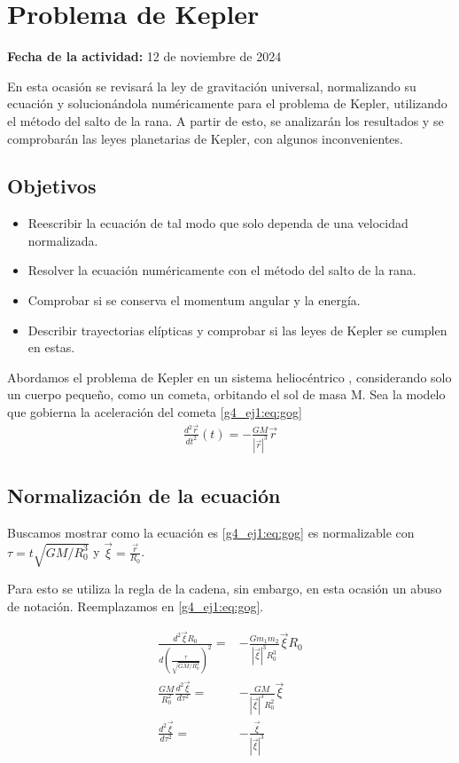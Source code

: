 \documentclass[../portafolio.tex]{subfiles}
\begin{document}
\chapter{Problema de Kepler}
\label{g4_ej1}
\hfill \textbf{Fecha de la actividad:} 12 de noviembre de 2024

\medskip

En esta ocasión se revisará la ley de gravitación universal, normalizando su ecuación y solucionándola numéricamente para el problema de Kepler, utilizando el método del salto de la rana. A partir de esto, se analizarán los resultados y se comprobarán las leyes planetarias de Kepler, con algunos inconvenientes.

\section*{Objetivos}
\begin{itemize}
\item Reescribir la ecuación de tal modo que solo dependa de una velocidad normalizada.
\item Resolver la ecuación numéricamente con el método del salto de la rana.
\item Comprobar si se conserva el momentum angular y la energía.
\item Describir trayectorias elípticas y comprobar si las leyes de Kepler se cumplen en estas.
\end{itemize}
Abordamos el problema de Kepler en un sistema heliocéntrico , considerando solo un cuerpo pequeño, como un cometa, orbitando el sol de masa M. Sea la modelo que gobierna la aceleración del cometa \eqref{g4_ej1:eq:gog}
\begin{align} \label{g4_ej1:eq:gog}
\frac{d^2 \vec{r}}{dt^2}(t) = - \frac{GM}{|\vec{r}|^3}\vec{r} 
 \end{align}
\section{Normalización de la ecuación}
Buscamos mostrar como la ecuación es \eqref{g4_ej1:eq:gog} es normalizable con $\tau=t\sqrt{GM/R_0^3}$  y $\vec{\xi}=\frac{\vec{r}}{R_0}$.


Para esto se utiliza la regla de la cadena, sin embargo, en esta ocasión un abuso de notación. Reemplazamos en \eqref{g4_ej1:eq:gog}.

\begin{align}
\frac{d^2 \vec{\xi} R_0}{d(\frac{\tau}{\sqrt{GM/R_0^3}})^2}=&-\frac{Gm_1m_2}{|\vec{\xi}|^3 R_0^3}\vec{\xi}R_0\\
\frac{GM}{R_0^2}\frac{d^2 \vec{\xi}}{d\tau^2}=&-\frac{GM}{|\vec{\xi}|^3 R_0^2}\vec{\xi}\\
\frac{d^2 \vec{\xi}}{d\tau^2}=&-\frac{\vec{\xi}}{|\vec{\xi}|^3 }\label{g4_ej1:normalizada}
\end{align}
\end{document}
